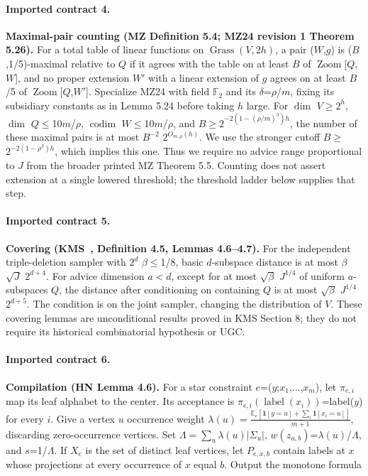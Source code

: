 \paragraph{Imported contract 4.} \textbf{Maximal-pair counting (MZ Definition 5.4; MZ24 revision 1 Theorem 5.26).} For a total table of linear functions on \(\operatorname{Grass}(V,2h)\), a pair (\(W\),\(g\)) is (\(B\),1/5)-maximal relative to \(Q\) if it agrees with the table on at least \(B\) of \(\operatorname{Zoom}\)[\(Q\),\(W\)], and no proper extension \(W'\) with a linear extension of \(g\) agrees on at least \(B\)/5 of \(\operatorname{Zoom}\)[\(Q\),\(W'\)]. Specialize MZ24 with field \(\mathbb F_2\) and its \(\delta\)=\(\rho\)/\(m\), fixing its subsidiary constants as in Lemma 5.24 before taking \(h\) large. For \(\dim\) \(V\)\(\ge\)\(2^h\), \(\dim\) \(Q\)\(\le\)10\(m\)/\(\rho\), \(\operatorname{codim}\) \(W\)\(\le\)10\(m\)/\(\rho\), and \(B\)\(\ge\)\(2^{-2(1-(\rho/m)^3)h}\), the number of these maximal pairs is at most \(B^{-2}\) \(2^{O_{m,\rho}(h)}\). We use the stronger cutoff \(B\)\(\ge\)\(2^{-2(1-\rho^3)h}\), which implies this one. Thus we require no advice range proportional to \(J\) from the broader printed MZ Theorem 5.5. Counting does not assert extension at a single lowered threshold; the threshold ladder below supplies that step.

\paragraph{Imported contract 5.} \textbf{Covering (KMS~\cite{KMS}, Definition 4.5, Lemmas 4.6--4.7).} For the independent triple-deletion sampler with \(2^d\) \(\beta\)\(\le\)1/8, basic \(d\)-subspace distance is at most \(\beta\) \(\sqrt{J}\) \(2^{d+4}\). For advice dimension \(a\)\(<\)\(d\), except for at most \(\sqrt{\beta}\) \(J^{1/4}\) of uniform \(a\)-subspaces \(Q\), the distance after conditioning on containing \(Q\) is at most \(\sqrt{\beta}\) \(J^{1/4}\) \(2^{d+5}\). The condition is on the joint sampler, changing the distribution of \(V\). These covering lemmas are unconditional results proved in KMS Section 8; they do not require its historical combinatorial hypothesis or UGC.

\paragraph{Imported contract 6.} \textbf{Compilation (HN Lemma 4.6).} For a star constraint \(e\)=(\(y\);\(x_1\),...,\(x_m\)), let \(\pi_{e,i}\) map its leaf alphabet to the center. Its acceptance is \(\pi_{e,i}(\operatorname{label}(x_i))\)=label(\(y\)) for every \(i\). Give a vertex \(u\) occurrence weight \(\lambda(u)=\frac{\mathbb E_e[\mathbf1[y=u]+\sum_i\mathbf1[x_i=u]]}{m+1}\), discarding zero-occurrence vertices. Set \(\Lambda=\sum_u\lambda(u)|\Sigma_u|\), \(w(z_{u,b})\)=\(\lambda(u)\)/\(\Lambda\), and \(s\)=1/\(\Lambda\). If \(X_e\) is the set of distinct leaf vertices, let \(P_{e,x,b}\) contain labels at \(x\) whose projections at every occurrence of \(x\) equal \(b\). Output the monotone formula

